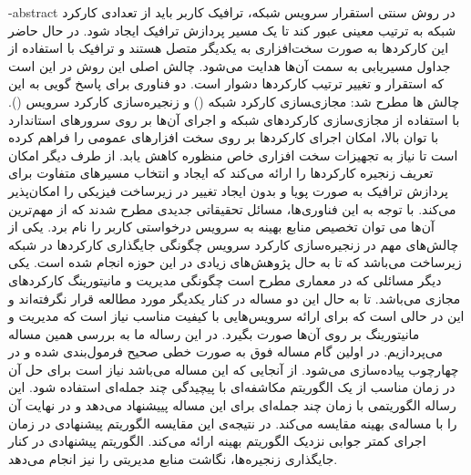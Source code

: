 
\fa-abstract{
    در روش سنتی استقرار سرویس شبکه، ترافیک کاربر باید از تعدادی کارکرد شبکه به ترتیب معینی عبور کند تا یک مسیر پردازش ترافیک ایجاد شود.
    در حال حاضر این کارکردها به صورت سخت‌افزاری به یکدیگر متصل هستند و ترافیک با استفاده از جداول مسیریابی به سمت آن‌ها هدایت می‌شود.
    چالش اصلی این روش در این است که استقرار و تغییر ترتیب کارکردها دشوار است.
    دو فناوری برای پاسخ گویی به این چالش ها مطرح شد:
    مجازی‌‍سازی کارکرد شبکه () و زنجیره‌سازی کارکرد سرویس ().
    با استفاده از مجازی‌سازی کارکردهای شبکه و اجرای آن‌ها بر روی سرورهای استاندارد با توان بالا، امکان اجرای کارکردها بر روی سخت افزارهای عمومی را فراهم کرده است
    تا نیاز به تجهیزات سخت افزاری خاص منظوره کاهش یابد.
    از طرف دیگر  امکان تعریف زنجیره کارکردها را ارائه می‌کند
    که ایجاد و انتخاب مسیرهای متفاوت برای پردازش ترافیک به صورت پویا و بدون ایجاد تغییر در زیرساخت فیزیکی را امکان‌پذیر می‌کند.
    با توجه به این فناوری‌ها، مسائل تحقیقاتی جدیدی مطرح شدند که از مهم‌ترین آن‌ها می توان تخصیص منابع بهینه به سرویس درخواستی کاربر را نام برد.
    یکی از چالش‌های مهم در زنجیره‌سازی کارکرد سرویس چگونگی جایگذاری کارکرد‌ها در شبکه زیرساخت می‌باشد که تا به حال پژوهش‌های زیادی در این حوزه انجام شده است.
    یکی دیگر مسائلی که در معماری  مطرح است چگونگی مدیریت و مانیتورینگ کارکردهای مجازی می‌باشد. تا به حال این دو مساله در کنار یکدیگر مورد مطالعه قرار نگرفته‌اند
    و این در حالی است که برای ارائه سرویس‌هایی با کیفیت مناسب نیاز است که مدیریت و مانیتورینگ بر روی آن‌ها صورت بگیرد.
    در این رساله ما به بررسی همین مساله می‌پردازیم.
    در اولین گام مساله فوق به صورت خطی صحیح فرمول‌بندی شده و در چهارچوب  پیاده‌سازی می‌شود.
    از آنجایی که این مساله  می‌باشد نیاز است برای حل آن در زمان مناسب از یک الگوریتم مکاشفه‌ای با پیچیدگی چند جمله‌ای استفاده شود.
    این رساله الگوریتمی با زمان چند جمله‌ای برای این مساله پییشنهاد می‌دهد و در نهایت آن را با مساله‌ی بهینه مقایسه می‌کند.  
    در نتیجه‌ی این مقایسه الگوریتم پیشنهادی در زمان اجرای کمتر جوابی نزدیک الگوریتم بهینه
    ارائه می‌کند. الگوریتم پیشنهادی در کنار جایگذاری زنجیره‌ها، نگاشت منابع مدیریتی را نیز انجام می‌دهد.
}





\AUTtitle
